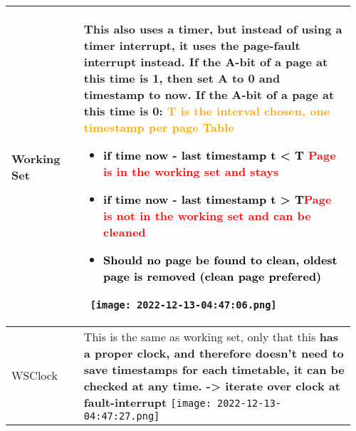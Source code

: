 \documentclass[main.tex,fontsize=8pt,paper=a4,paper=portrait,DIV=calc,]{scrartcl}
\begin{document}
\begin{table}[ht!]
\begin{tabular}{|m{0.2\linewidth}|m{0.755\linewidth}|}
\hline
Working Set & 
This also uses a timer, but \textbf{instead of using a timer interrupt, it uses the page-fault interrupt instead}.\newline
If the A-bit of a page at this time is 1, then set A to 0 and timestamp to now.\newline
If the A-bit of a page at this time is 0:\newline
\textcolor{orange}{T is the interval chosen, one timestamp per page Table}\newline
\begin{itemize}
\item \textcolor{black}{if time now - last timestamp t < T} \textcolor{red}{Page is in the working set and stays}
\item \textcolor{black}{if time now - last timestamp t > T}\textcolor{red}{Page is not in the working set and can be cleaned}
\item \textcolor{black}{Should no page be found to clean, oldest page is removed (clean page prefered)}
\end{itemize}
\, \newline
\texttt{[image: 2022-12-13-04:47:06.png]}\\
\hline
WSClock & 
This is the same as working set, only that this \textbf{has a proper clock, and therefore doesn't need to save timestamps for each timetable, it can be checked at any time. -> iterate over clock at fault-interrupt}\newline
\texttt{[image: 2022-12-13-04:47:27.png]}\\
\hline

\hline

\hline

\hline

\hline

\hline

\hline

\hline

\hline

\hline

\hline

\hline

\hline
\end{tabular}
\end{table}
\pagebreak
\end{document}
